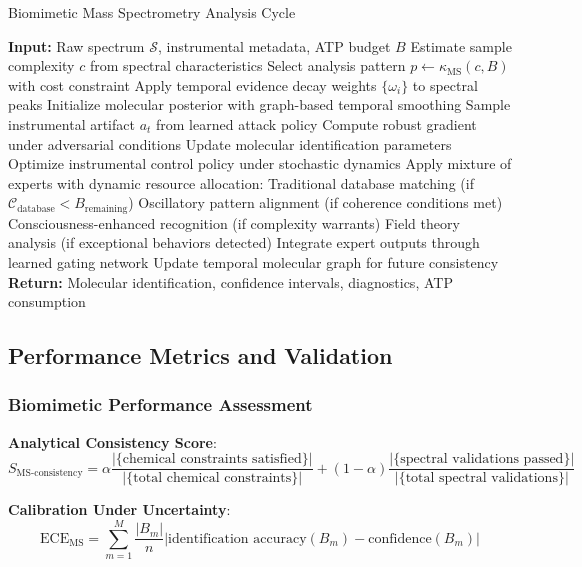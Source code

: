 \documentclass[11pt,a4paper]{article}
\theoremstyle{remark}
\begin{document}
\begin{algorithm}[H]
\caption{Biomimetic Mass Spectrometry Analysis Cycle}
\begin{algorithmic}[1]
\State \textbf{Input:} Raw spectrum $\mathcal{S}$, instrumental metadata, ATP budget $B$
\State Estimate sample complexity $c$ from spectral characteristics
\State Select analysis pattern $p \gets \kappa_{\text{MS}}(c, B)$ with cost constraint
\State Apply temporal evidence decay weights $\{\omega_i\}$ to spectral peaks
\State Initialize molecular posterior with graph-based temporal smoothing
\State Sample instrumental artifact $a_t$ from learned attack policy
\State Compute robust gradient under adversarial conditions
\State Update molecular identification parameters
\EndFor
\State Optimize instrumental control policy under stochastic dynamics
\State Apply mixture of experts with dynamic resource allocation:
\State \quad Traditional database matching (if $\mathcal{C}_{\text{database}} < B_{\text{remaining}}$)
\State \quad Oscillatory pattern alignment (if coherence conditions met)
\State \quad Consciousness-enhanced recognition (if complexity warrants)
\State \quad Field theory analysis (if exceptional behaviors detected)
\State Integrate expert outputs through learned gating network
\State Update temporal molecular graph for future consistency
\State \textbf{Return:} Molecular identification, confidence intervals, diagnostics, ATP consumption
\end{algorithmic}
\end{algorithm}

\subsection{Performance Metrics and Validation}

\subsubsection{Biomimetic Performance Assessment}

\textbf{Analytical Consistency Score}:
\begin{equation}
S_{\text{MS-consistency}} = \alpha \frac{|\{\text{chemical constraints satisfied}\}|}{|\{\text{total chemical constraints}\}|} + (1-\alpha) \frac{|\{\text{spectral validations passed}\}|}{|\{\text{total spectral validations}\}|}
\end{equation}

\textbf{Calibration Under Uncertainty}:
\begin{equation}
\text{ECE}_{\text{MS}} = \sum_{m=1}^{M} \frac{|B_m|}{n} \left|\text{identification accuracy}(B_m) - \text{confidence}(B_m)\right|
\end{equation}
\end{document}
